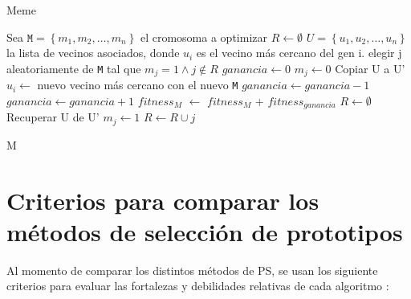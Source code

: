 \begin{algorithm}
\caption{Meme}
\label{meme}
\begin{algorithmic}[1]


\State Sea $\texttt{M} = \left\{ m_1,m_2,\dots,m_n \right\}$ el cromosoma a optimizar 
\State $R \gets \emptyset$
\State $ U = \left\{ u_1,u_2,\dots,u_n \right\}$ la lista de vecinos asociados, donde $u_i$ es el vecino más cercano del gen i. 
	\State elegir j aleatoriamente de \texttt{M} tal que $m_j=1 \land j \notin R$
	\State $ganancia \gets 0$
	\State $m_j \gets 0$
	\State Copiar U a U'
		\State $u_i \gets$ nuevo vecino más cercano con el nuevo \texttt{M}
			\State $ganancia \gets ganancia - 1$
			\State $ganancia \gets ganancia + 1$
		\EndIf
	\EndFor
		\State \emph{$fitness_M$} $\gets$ \emph{$fitness_M$} + \emph{$fitness_{ganancia}$}
		\State $R \gets \emptyset$
	\Else
		\State Recuperar U de U'
		\State $m_j \gets 1$
		\State $ R \gets R \cup j$
	\EndIf
\EndWhile

\State \Return M

\end{algorithmic}
\end{algorithm}

\section{Criterios para comparar los métodos de selección de prototipos}

Al momento de comparar los distintos métodos de PS, se usan los siguiente criterios para evaluar las fortalezas y debilidades relativas de cada algoritmo \cite{garcia2016data}:

